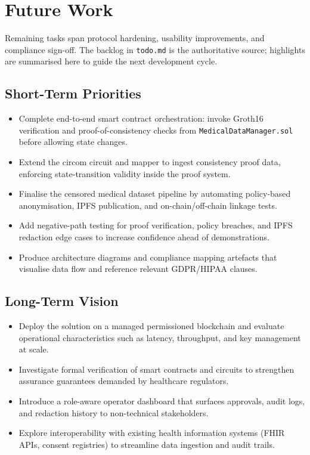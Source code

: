 \section{Future Work}

Remaining tasks span protocol hardening, usability improvements, and compliance sign-off. The backlog in \texttt{todo.md} is the authoritative source; highlights are summarised here to guide the next development cycle.

\subsection{Short-Term Priorities}
\begin{itemize}
    \item Complete end-to-end smart contract orchestration: invoke Groth16 verification and proof-of-consistency checks from \texttt{MedicalDataManager.sol} before allowing state changes.
    \item Extend the circom circuit and mapper to ingest consistency proof data, enforcing state-transition validity inside the proof system.
    \item Finalise the censored medical dataset pipeline by automating policy-based anonymisation, IPFS publication, and on-chain/off-chain linkage tests.
    \item Add negative-path testing for proof verification, policy breaches, and IPFS redaction edge cases to increase confidence ahead of demonstrations.
    \item Produce architecture diagrams and compliance mapping artefacts that visualise data flow and reference relevant GDPR/HIPAA clauses.
\end{itemize}

\subsection{Long-Term Vision}
\begin{itemize}
    \item Deploy the solution on a managed permissioned blockchain and evaluate operational characteristics such as latency, throughput, and key management at scale.
    \item Investigate formal verification of smart contracts and circuits to strengthen assurance guarantees demanded by healthcare regulators.
    \item Introduce a role-aware operator dashboard that surfaces approvals, audit logs, and redaction history to non-technical stakeholders.
    \item Explore interoperability with existing health information systems (FHIR APIs, consent registries) to streamline data ingestion and audit trails.
\end{itemize}
